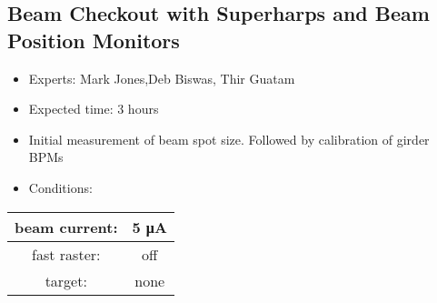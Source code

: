 \documentclass[]{article}
\begin{document}
	
\subsection{Beam Checkout with Superharps and Beam Position
			Monitors}\label{beam-checkout-with-superharps-and-beam-position-monitors}
	
	\begin{itemize}
		\item
		Experts: Mark Jones,Deb Biswas, Thir Guatam
		\item
		Expected time: 3 hours
		\item
		Initial measurement of beam spot size. Followed by calibration of
		girder BPMs
		\item
		Conditions:
	\end{itemize}
	
	\begin{tabular}[]{|c|c|} \hline\hline
		beam current: & 5 μA\\ \hline
		fast raster: & off\\ \hline
		target: & none\\ \hline
	\end{tabular}
	
\end{document}
